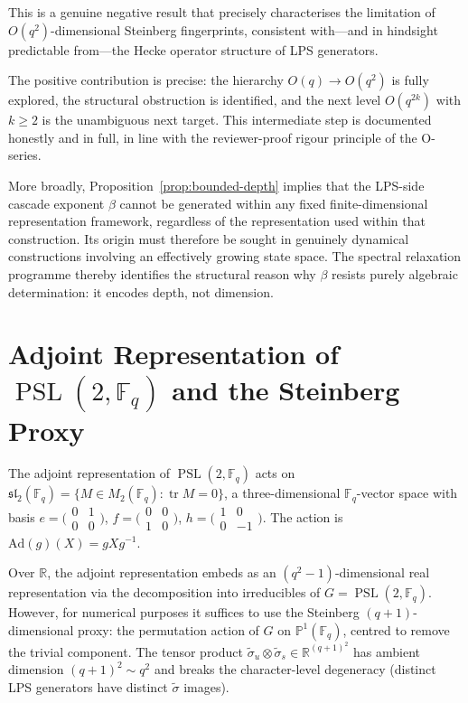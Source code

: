 \documentclass[11pt]{article}
\theoremstyle{definition}
\theoremstyle{remark}
\DeclareMathOperator{\PSL}{PSL}
\DeclareMathOperator{\tr}{tr}
\newcommand{\R}{\mathbb{R}}
\newcommand{\F}{\mathbb{F}}
\begin{document}
    This is a genuine negative result that precisely characterises the limitation of
    $O(q^2)$-dimensional Steinberg fingerprints, consistent with---and in hindsight
    predictable from---the Hecke operator structure of LPS generators.

    The positive contribution is precise: the hierarchy $O(q) \to O(q^2)$ is fully
    explored, the structural obstruction is identified, and the next level
    $O(q^{2k})$ with $k \geq 2$ is the unambiguous next target.
    This intermediate step is documented honestly and in full, in line with the
    reviewer-proof rigour principle of the O-series.

    More broadly, Proposition~\ref{prop:bounded-depth} implies that the LPS-side cascade exponent
    $\beta$ cannot be generated within any fixed finite-dimensional representation framework,
    regardless of the representation used within that construction.
    Its origin must therefore be sought in genuinely dynamical constructions involving an
    effectively growing state space.
    The spectral relaxation programme thereby identifies the structural reason why $\beta$
    resists purely algebraic determination: it encodes depth, not dimension.


    \appendix

  \section{Adjoint Representation of $\PSL(2, \F_q)$ and the Steinberg Proxy}
  \label{app:adjoint}

  The adjoint representation of $\PSL(2, \F_q)$ acts on
  $\mathfrak{sl}_2(\F_q) = \{ M \in M_2(\F_q) : \tr M = 0 \}$,
  a three-dimensional $\F_q$-vector space with basis
  $e = \bigl(\begin{smallmatrix}
                   0&1\\0&0
  \end{smallmatrix}\bigr)$,
  $f = \bigl(\begin{smallmatrix}
                   0&0\\1&0
  \end{smallmatrix}\bigr)$,
  $h = \bigl(\begin{smallmatrix}
                   1&0\\0&-1
  \end{smallmatrix}\bigr)$.
  The action is $\mathrm{Ad}(g)(X) = gXg^{-1}$.

  Over $\R$, the adjoint representation embeds as an $(q^2-1)$-dimensional real
  representation via the decomposition into irreducibles of $G = \PSL(2, \F_q)$.
  However, for numerical purposes it suffices to use the Steinberg
  $(q+1)$-dimensional proxy: the permutation action of $G$ on $\mathbb{P}^1(\F_q)$,
  centred to remove the trivial component.
  The tensor product
  $\tilde\sigma_u \otimes \tilde\sigma_s \in \R^{(q+1)^2}$
  has ambient dimension $(q+1)^2 \sim q^2$ and breaks the character-level
  degeneracy (distinct LPS generators have distinct $\tilde\sigma$ images).
\end{document}

